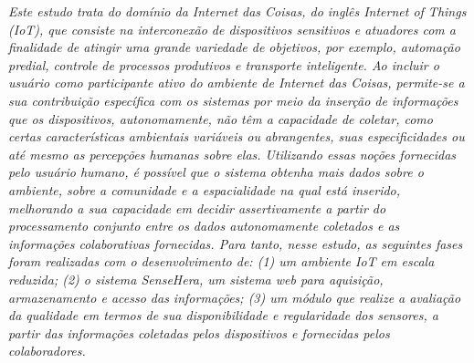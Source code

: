 \emph{
Este estudo trata do domínio da Internet das Coisas, do inglês \textit{Internet of Things} (IoT), que consiste na interconexão de dispositivos
 sensitivos e atuadores com a finalidade de atingir uma grande variedade de objetivos, por exemplo, automação predial, controle de processos produtivos e transporte inteligente. %
 Ao incluir o usuário como participante ativo do ambiente de Internet das Coisas,
 permite-se a sua contribuição específica com os sistemas por meio da inserção de informações que os
  dispositivos, autonomamente, não têm a capacidade de coletar,
 como certas características ambientais variáveis ou abrangentes, suas especificidades ou até
  mesmo as percepções humanas sobre elas.
  Utilizando essas noções fornecidas pelo usuário humano, é possível que o sistema obtenha mais
  dados sobre o ambiente, sobre a comunidade e a espacialidade na qual está inserido, melhorando
  a sua capacidade em decidir assertivamente a partir do processamento conjunto entre os dados autonomamente
  coletados e as informações colaborativas fornecidas.
  Para tanto, nesse estudo, as seguintes fases foram realizadas com o desenvolvimento de: (1) um ambiente IoT em escala reduzida;
  (2) o sistema SenseHera, um sistema web para aquisição, armazenamento e acesso das informações;
  (3) um módulo que realize a avaliação da qualidade em termos de sua disponibilidade e regularidade dos sensores, a partir das informações coletadas pelos dispositivos e fornecidas pelos colaboradores.
}
